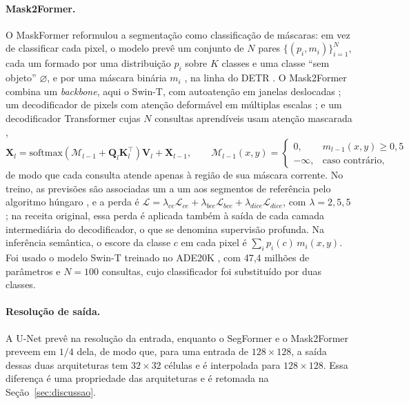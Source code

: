 \documentclass[12pt]{article}
\begin{document}
\paragraph{Mask2Former.} O MaskFormer reformulou a segmentação como classificação de máscaras: em vez de classificar cada pixel, o modelo prevê um conjunto de $N$ pares $\{(p_i,m_i)\}_{i=1}^N$, cada um formado por uma distribuição $p_i$ sobre $K$ classes e uma classe ``sem objeto'' $\varnothing$, e por uma máscara binária $m_i$ \cite{cheng2021maskformer}, na linha do DETR \cite{carion2020detr}. O Mask2Former combina um \textit{backbone}, aqui o Swin-T, com autoatenção em janelas deslocadas \cite{liu2021swin}; um decodificador de pixels com atenção deformável em múltiplas escalas \cite{zhu2021deformable}; e um decodificador Transformer cujas $N$ consultas aprendíveis usam atenção mascarada \cite{cheng2022mask2former},
\begin{equation}
\mathbf{X}_l=\mathrm{softmax}(\mathcal{M}_{l-1}+\mathbf{Q}_l\mathbf{K}_l^\top)\mathbf{V}_l+\mathbf{X}_{l-1},\qquad
\mathcal{M}_{l-1}(x,y)=\begin{cases}0, & m_{l-1}(x,y)\geq 0{,}5\\ -\infty, & \text{caso contrário,}\end{cases}
\end{equation}
de modo que cada consulta atende apenas à região de sua máscara corrente. No treino, as previsões são associadas um a um aos segmentos de referência pelo algoritmo húngaro \cite{kuhn1955}, e a perda é $\mathcal{L}=\lambda_{ce}\mathcal{L}_{ce}+\lambda_{bce}\mathcal{L}_{bce}+\lambda_{dice}\mathcal{L}_{dice}$, com $\lambda=2,5,5$; na receita original, essa perda é aplicada também à saída de cada camada intermediária do decodificador, o que se denomina supervisão profunda. Na inferência semântica, o escore da classe $c$ em cada pixel é $\sum_i p_i(c)\,m_i(x,y)$. Foi usado o modelo Swin-T treinado no ADE20K \cite{zhou2017ade}, com 47,4 milhões de parâmetros e $N=100$ consultas, cujo classificador foi substituído por duas classes.

\paragraph{Resolução de saída.} A U-Net prevê na resolução da entrada, enquanto o SegFormer e o Mask2Former preveem em $1/4$ dela, de modo que, para uma entrada de $128\times128$, a saída dessas duas arquiteturas tem $32\times32$ células e é interpolada para $128\times128$. Essa diferença é uma propriedade das arquiteturas e é retomada na Seção~\ref{sec:discussao}.
\end{document}
